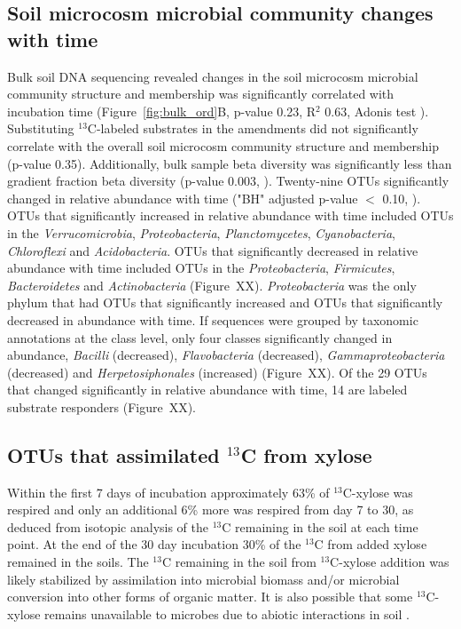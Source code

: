 \subsection{Soil microcosm microbial community changes with time}
Bulk soil DNA sequencing revealed changes in the soil microcosm microbial community structure and membership was significantly
correlated with incubation time (Figure~\ref{fig:bulk_ord}B, p-value 0.23,
R$^{2}$ 0.63, Adonis test \citet{Anderson2001a}). Substituting $^{13}$C-labeled substrates in the amendments did not significantly correlate with the overall soil microcosm
community structure and membership (p-value 0.35). Additionally, bulk sample
beta diversity was significantly less than gradient fraction beta diversity
(p-value 0.003, \citet{Anderson2006}). Twenty-nine OTUs significantly changed
in relative abundance with time ("BH" adjusted p-value $<$ 0.10,
\citet{YBenjamini1995}). OTUs that significantly increased in relative
abundance with time included OTUs in the \textit{Verrucomicrobia},
\textit{Proteobacteria}, \textit{Planctomycetes}, \textit{Cyanobacteria},
\textit{Chloroflexi} and \textit{Acidobacteria}. OTUs that significantly
decreased in relative abundance with time included OTUs in the
\textit{Proteobacteria}, \textit{Firmicutes}, \textit{Bacteroidetes} and
\textit{Actinobacteria} (Figure~XX).  \textit{Proteobacteria} was the only
phylum that had OTUs that significantly increased and OTUs that significantly
decreased in abundance with time. If sequences were grouped by taxonomic
annotations at the class level, only four classes significantly changed in
abundance, \textit{Bacilli} (decreased), \textit{Flavobacteria} (decreased),
\textit{Gammaproteobacteria} (decreased) and \textit{Herpetosiphonales}
(increased) (Figure~XX). Of the 29 OTUs that changed significantly in relative
abundance with time, 14 are labeled substrate responders (Figure~XX).

\subsection{OTUs that assimilated $^{13}$C from xylose}
Within the first 7 days of
incubation approximately 63\% of $^{13}$C-xylose was respired and only an
additional 6\% more was respired from day 7 to 30, as deduced from isotopic analysis of the $^{13}$C remaining in the soil at each time point. At the end of the 30 day
incubation 30\% of the $^{13}$C from added xylose remained in the soils. The
$^{13}$C remaining in the soil from $^{13}$C-xylose addition was likely
stabilized by assimilation into microbial biomass and/or microbial conversion
into other forms of organic matter. It is also possible that some
$^{13}$C-xylose remains unavailable to microbes due to abiotic interactions in
soil \citep{Kalbitz_2000}. 

